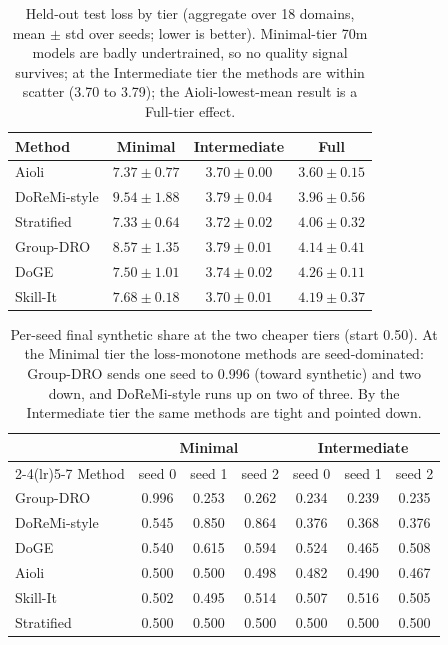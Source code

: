 \documentclass{article}
\begin{document}
\begin{table}[t]
\centering
\small
\caption{Held-out test loss by tier (aggregate over 18 domains, mean $\pm$ std over seeds; lower is better). Minimal-tier 70m models are badly undertrained, so no quality signal survives; at the Intermediate tier the methods are within scatter (3.70 to 3.79); the Aioli-lowest-mean result is a Full-tier effect.}
\label{tab:tier-test}
\begin{tabular}{lccc}
\toprule
Method & Minimal & Intermediate & Full \\
\midrule
Aioli & $7.37 \pm 0.77$ & $3.70 \pm 0.00$ & $3.60 \pm 0.15$ \\
DoReMi-style & $9.54 \pm 1.88$ & $3.79 \pm 0.04$ & $3.96 \pm 0.56$ \\
Stratified & $7.33 \pm 0.64$ & $3.72 \pm 0.02$ & $4.06 \pm 0.32$ \\
Group-DRO & $8.57 \pm 1.35$ & $3.79 \pm 0.01$ & $4.14 \pm 0.41$ \\
DoGE & $7.50 \pm 1.01$ & $3.74 \pm 0.02$ & $4.26 \pm 0.11$ \\
Skill-It & $7.68 \pm 0.18$ & $3.70 \pm 0.01$ & $4.19 \pm 0.37$ \\
\bottomrule
\end{tabular}
\end{table}

\begin{table}[t]
\centering
\small
\caption{Per-seed final synthetic share at the two cheaper tiers (start 0.50). At the Minimal tier the loss-monotone methods are seed-dominated: Group-DRO sends one seed to 0.996 (toward synthetic) and two down, and DoReMi-style runs up on two of three. By the Intermediate tier the same methods are tight and pointed down.}
\label{tab:tier-perseed}
\begin{tabular}{lcccccc}
\toprule
 & \multicolumn{3}{c}{Minimal} & \multicolumn{3}{c}{Intermediate} \\
\cmidrule(lr){2-4}\cmidrule(lr){5-7}
Method & seed 0 & seed 1 & seed 2 & seed 0 & seed 1 & seed 2 \\
\midrule
Group-DRO & 0.996 & 0.253 & 0.262 & 0.234 & 0.239 & 0.235 \\
DoReMi-style & 0.545 & 0.850 & 0.864 & 0.376 & 0.368 & 0.376 \\
DoGE & 0.540 & 0.615 & 0.594 & 0.524 & 0.465 & 0.508 \\
Aioli & 0.500 & 0.500 & 0.498 & 0.482 & 0.490 & 0.467 \\
Skill-It & 0.502 & 0.495 & 0.514 & 0.507 & 0.516 & 0.505 \\
Stratified & 0.500 & 0.500 & 0.500 & 0.500 & 0.500 & 0.500 \\
\bottomrule
\end{tabular}
\end{table}
\end{document}
